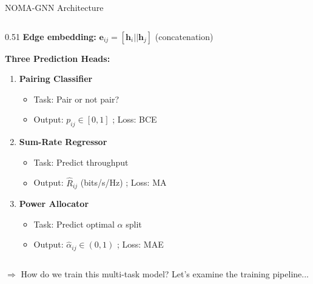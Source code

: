 \documentclass[aspectratio=169]{beamer}
\begin{document}
\begin{frame}{NOMA-GNN Architecture}
\begin{columns}[T]
\begin{column}{0.51\textwidth}
            \small \textbf{Edge embedding:} $\mathbf{e}_{ij} = [\mathbf{h}_i || \mathbf{h}_j]$ (concatenation)
            
            \vspace{0.15cm}
            
            \textbf{Three Prediction Heads:}
            \begin{enumerate}\itemsep0.15em
                \item \textbf{Pairing Classifier}
                \begin{itemize}\itemsep0.05em
                    \item Task: Pair or not pair?
                    \item Output: $p_{ij} \in [0,1]$ ; Loss: BCE
                \end{itemize}
                
                \item \textbf{Sum-Rate Regressor}
                \begin{itemize}\itemsep0.05em
                    \item Task: Predict throughput
                    \item Output: $\hat{R}_{ij}$ (bits/s/Hz) ; Loss: MA
                \end{itemize}
                
                \item \textbf{Power Allocator}
                \begin{itemize}\itemsep0.03em
                    \item Task: Predict optimal $\alpha$ split
                    \item Output: $\hat{\alpha}_{ij} \in (0,1)$  ; Loss: MAE
                \end{itemize}
            \end{enumerate}
        \end{column}
    \end{columns}
    
    \vspace{0.15cm}
    \small \textcolor{iiitblue}{$\Rightarrow$ How do we train this multi-task model? Let's examine the training pipeline...}
\end{frame}
\end{document}
